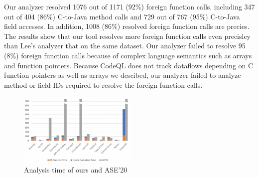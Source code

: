 

Our analyzer resolved 1076 out of 1171 (92\%) foreign function calls, including
347 out of 404 (86\%) C-to-Java method calls and 729 out of 767 (95\%)
C-to-Java field accesses. In addition, 1008 (86\%) resolved foreign function
calls are precies. The results show that our tool resolves more foreign
function calls even precisley than Lee's analyzer that  on the same
dataset. Our analyzer failed to resolve 95 (8\%) foreign function calls because
of complex language semantics such as arrays and function pointers. Because
CodeQL does not track dataflows depending on C function pointers as well as
arrays we descibed, our analyzer failed to analyze method or field IDs required
to resolve the foreign function calls.

\begin{figure}[t]
  \centering
  \vspace{2mm}
  \includegraphics[width=0.5\textwidth]{img/graph}
  \vspace*{-1.5em}
  \caption{Analysis time of ours and ASE'20}
  \label{fig:graph}
\vspace*{-.5em}
\end{figure}

